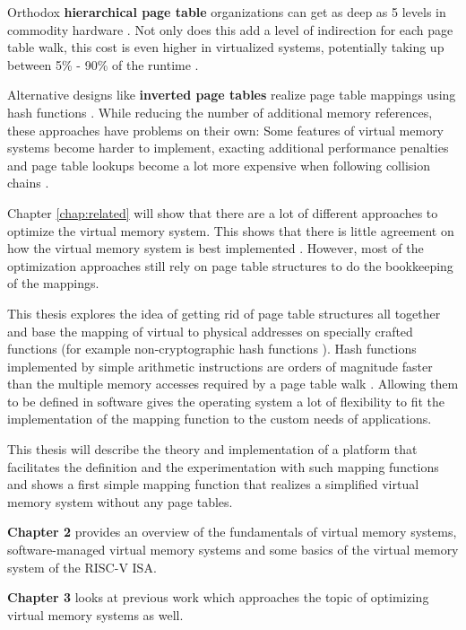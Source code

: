 Orthodox \textbf{hierarchical page table} organizations \cite{tanenbaumOS} can get as deep as 5 levels in commodity hardware \cite{intel5LevelPaging5Level2017}. Not only does this add a level of indirection for each page table walk, this cost is even higher in virtualized systems, potentially taking up between 5\% - 90\% of the runtime \cite{yaniv2016hash}.

Alternative designs like \textbf{inverted page tables} realize page table mappings using hash functions \cite{tanenbaumOS}. While reducing the number of additional memory references, these approaches have problems on their own: Some features of virtual memory systems become harder to implement, exacting additional performance penalties \cite{yaniv2016hash} and page table lookups become a lot more expensive when following collision chains \cite{jacob1998look}.

Chapter \ref{chap:related} will show that there are a lot of different approaches to optimize the virtual memory system.
This shows that there is little agreement on how the virtual memory system is best implemented \cite{jacob1998look}.
However, most of the optimization approaches still rely on page table structures to do the bookkeeping of the mappings.

This thesis explores the idea of getting rid of page table structures all together and base the mapping of virtual to physical addresses on specially crafted functions (for example non-cryptographic hash functions \cite{mittelbach2021non}).
Hash functions implemented by simple arithmetic instructions are orders of magnitude faster than the multiple memory accesses required by a page table walk \cite{tanenbaumOS}. Allowing them to be defined in software gives the operating system a lot of flexibility to fit the implementation of the mapping function to the custom needs of applications.

This thesis will describe the theory and implementation of a platform that facilitates the definition and the experimentation with such mapping functions and shows a first simple mapping function that realizes a simplified virtual memory system without any page tables.


\textbf{Chapter 2} provides an overview of the fundamentals of virtual memory systems, software-managed virtual memory systems and some basics of the virtual memory system of the RISC-V ISA.

\textbf{Chapter 3} looks at previous work which approaches the topic of optimizing virtual memory systems as well.

